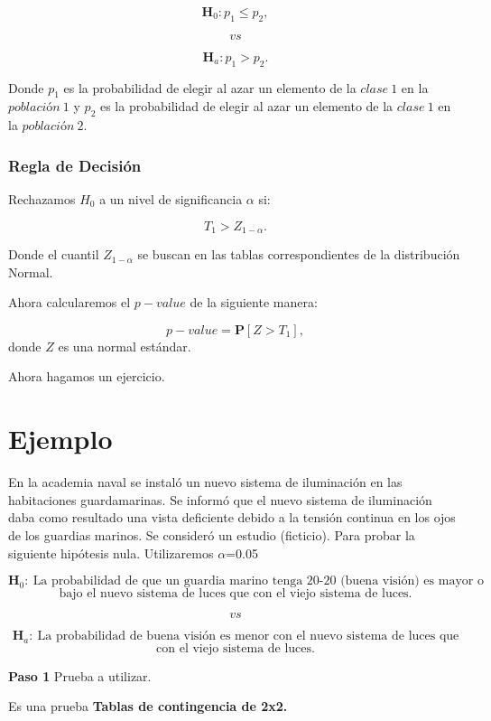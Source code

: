 \documentclass[
  a4paper,
  oneside,
  openany]{book}
\begin{document}
\[\textbf{H}_0: p_{1} \leq p_{2},\]

\[vs\]

\[\textbf{H}_a: p_{1} > p_{2}.\]

Donde \(p_{1}\) es la probabilidad de elegir al azar un elemento de la \(clase\ 1\) en la \(población\ 1\) y \(p_{2}\) es la probabilidad de elegir al azar un elemento de la \(clase\ 1\) en la \(población\ 2\).

\hypertarget{regla-de-decisiuxf3n-23}{%
\subsubsection*{Regla de Decisión}\label{regla-de-decisiuxf3n-23}}


Rechazamos \(H_0\) a un nivel de significancia \(\alpha\) si:

\[T_{1} > Z_{1-\alpha}.\]

Donde el cuantil \(Z_{1-\alpha}\) se buscan en las tablas correspondientes de la distribución Normal.

Ahora calcularemos el \(p-value\) de la siguiente manera:

\[p-value=\mathbf{P}[Z>T_{1}],\]
donde \(Z\) es una normal estándar.

Ahora hagamos un ejercicio.

\hypertarget{ejemplo-10}{%
\section{Ejemplo}\label{ejemplo-10}}

En la academia naval se instaló un nuevo sistema de iluminación en las habitaciones guardamarinas. Se informó que el nuevo sistema de iluminación daba como resultado una vista deficiente debido a la tensión continua en los ojos de los guardias marinos. Se consideró un estudio (ficticio). Para probar la siguiente hipótesis nula. Utilizaremos \(\alpha\)=0.05

\[\textbf{H}_0: \ \mbox{La probabilidad de que un guardia marino tenga 20-20 (buena visión) es mayor o igual}\]
\[\mbox{bajo el nuevo sistema de luces que con el viejo sistema de luces.}\]

\[vs\]

\[\textbf{H}_a: \ \mbox{La probabilidad de buena visión es menor con el nuevo sistema de luces que}\]
\[\mbox{con el viejo sistema de luces.}\]

\textbf{Paso 1} Prueba a utilizar.

Es una prueba \textbf{Tablas de contingencia de 2x2.}
\end{document}
